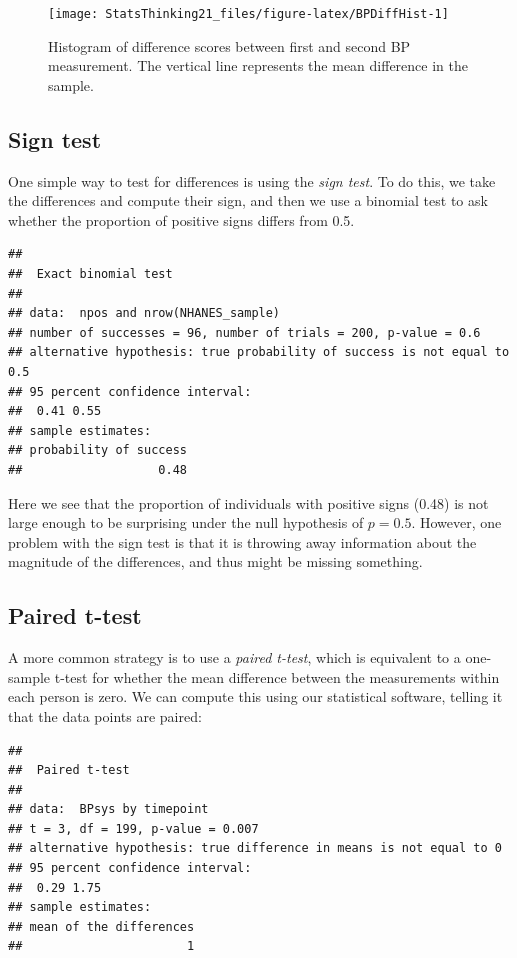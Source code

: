 \documentclass[12pt,]{book}
\theoremstyle{definition}
\theoremstyle{definition}
\theoremstyle{definition}
\theoremstyle{remark}
\begin{document}
\begin{figure}
\texttt{[image: StatsThinking21\_files/figure-latex/BPDiffHist-1]} \caption{Histogram of difference scores between first and second BP measurement. The vertical line represents the mean difference in the sample.}\label{fig:BPDiffHist}
\end{figure}

\hypertarget{sign-test}{%
\subsection{Sign test}\label{sign-test}}

One simple way to test for differences is using the \emph{sign test}. To do this, we take the differences and compute their sign, and then we use a binomial test to ask whether the proportion of positive signs differs from 0.5.

\begin{verbatim}
## 
##  Exact binomial test
## 
## data:  npos and nrow(NHANES_sample)
## number of successes = 96, number of trials = 200, p-value = 0.6
## alternative hypothesis: true probability of success is not equal to 0.5
## 95 percent confidence interval:
##  0.41 0.55
## sample estimates:
## probability of success 
##                   0.48
\end{verbatim}

Here we see that the proportion of individuals with positive signs (0.48) is not large enough to be surprising under the null hypothesis of \(p=0.5\). However, one problem with the sign test is that it is throwing away information about the magnitude of the differences, and thus might be missing something.

\hypertarget{paired-t-test}{%
\subsection{Paired t-test}\label{paired-t-test}}

A more common strategy is to use a \emph{paired t-test}, which is equivalent to a one-sample t-test for whether the mean difference between the measurements within each person is zero. We can compute this using our statistical software, telling it that the data points are paired:

\begin{verbatim}
## 
##  Paired t-test
## 
## data:  BPsys by timepoint
## t = 3, df = 199, p-value = 0.007
## alternative hypothesis: true difference in means is not equal to 0
## 95 percent confidence interval:
##  0.29 1.75
## sample estimates:
## mean of the differences 
##                       1
\end{verbatim}
\end{document}
